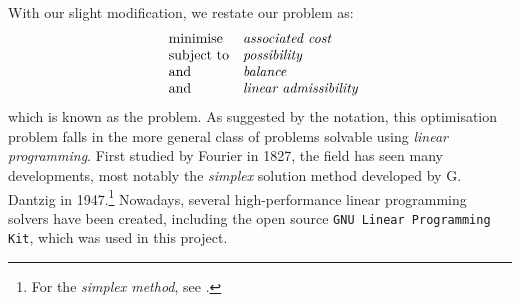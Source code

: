 \documentclass[main.tex]{subfiles}
\begin{document}
With our slight modification, we restate our problem as:
\begin{equation*}
    \begin{array}{ll@{}}
\text{minimise}  & \textit{associated cost} \\
\text{subject to}& \textit{possibility} \\
\text{and}& \textit{balance} \\
\text{and}& \textit{linear admissibility}
\end{array}
\end{equation*}
which is known as the  problem. As suggested by the notation, this optimisation problem falls in the more general class of problems solvable using \emph{linear programming}. First studied by  Fourier in 1827, the field has seen many developments, most notably the \emph{simplex} solution method developed by G. Dantzig in 1947.\footnote{For the \emph{simplex method}, see \cite{Matousek2007} .}
Nowadays, several high-performance linear programming solvers have been created, including the open source \texttt{GNU Linear Programming Kit}, which was used in this project.
\end{document}
